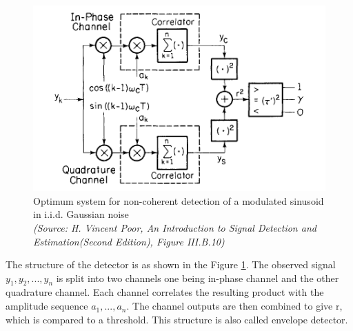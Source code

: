 \documentclass[a4paper,english,12pt]{article}
\begin{document}
\begin{figure}[hbtp]
	\centering
	\includegraphics[scale=0.75]{Figures/VP_III_B_10.png}
	\caption{Optimum system for non-coherent detection of a modulated sinusoid in i.i.d. Gaussian noise  \\ \textit{(Source: H. Vincent Poor, An Introduction to Signal Detection and Estimation(Second
			Edition), Figure III.B.10)}}
	\label{fn1}
\end{figure}
The structure of the detector is as shown in the  Figure \ref{fn1}. The observed signal $y_1,y_2,...,y_n$ is split into two channels one being in-phase channel and the other quadrature channel. Each channel correlates the resulting product with the amplitude sequence $a_1,...,a_n$. The channel outputs are then combined to give r, which is compared to a threshold. This structure is also called envelope detector.
\end{document}
